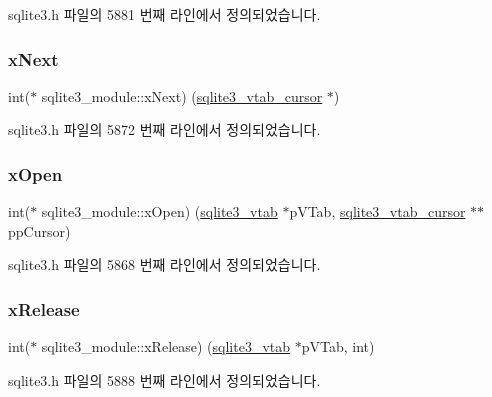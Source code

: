 sqlite3.\+h 파일의 5881 번째 라인에서 정의되었습니다.

\mbox{\label{structsqlite3__module_a7a95af281219212e50f3417f8c816bfc}} 
\subsubsection{\texorpdfstring{x\+Next}{xNext}}
{\footnotesize\ttfamily int($\ast$ sqlite3\+\_\+module\+::x\+Next) (\hyperlink{structsqlite3__vtab__cursor}{sqlite3\+\_\+vtab\+\_\+cursor} $\ast$)}



sqlite3.\+h 파일의 5872 번째 라인에서 정의되었습니다.

\mbox{\label{structsqlite3__module_a3f1e18ef5e5bd4ddbd9500c7cd951f34}} 
\subsubsection{\texorpdfstring{x\+Open}{xOpen}}
{\footnotesize\ttfamily int($\ast$ sqlite3\+\_\+module\+::x\+Open) (\hyperlink{structsqlite3__vtab}{sqlite3\+\_\+vtab} $\ast$p\+V\+Tab, \hyperlink{structsqlite3__vtab__cursor}{sqlite3\+\_\+vtab\+\_\+cursor} $\ast$$\ast$pp\+Cursor)}



sqlite3.\+h 파일의 5868 번째 라인에서 정의되었습니다.

\mbox{\label{structsqlite3__module_ac5f0d86a3e9a26668dbf1251a7c51517}} 
\subsubsection{\texorpdfstring{x\+Release}{xRelease}}
{\footnotesize\ttfamily int($\ast$ sqlite3\+\_\+module\+::x\+Release) (\hyperlink{structsqlite3__vtab}{sqlite3\+\_\+vtab} $\ast$p\+V\+Tab, int)}



sqlite3.\+h 파일의 5888 번째 라인에서 정의되었습니다.

